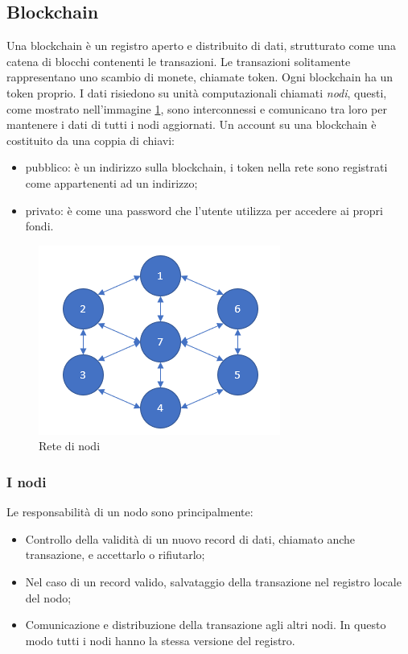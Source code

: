 \documentclass[a4paper]{article}
\begin{document}
    \subsection{Blockchain}
    Una blockchain è un registro aperto e distribuito di dati, strutturato come una catena di blocchi contenenti le transazioni.
    Le transazioni solitamente rappresentano uno scambio di monete, chiamate token. Ogni blockchain ha un token proprio.
    I dati risiedono su unità computazionali chiamati \emph{nodi}, questi, come mostrato nell'immagine \ref{fig:node},
    sono interconnessi e comunicano tra loro per mantenere i dati di tutti i nodi aggiornati\cite{nodo}.
    Un account su una blockchain è costituito da una coppia di chiavi:
    \begin{itemize}
      \item pubblico: è un indirizzo sulla blockchain, i token nella rete sono registrati come appartenenti ad un indirizzo;
      \item privato: è come una password che l'utente utilizza per accedere ai propri fondi.
    \end{itemize}
    \begin{figure}[ht]
      \includegraphics[scale=0.8]{node.png}
      \centering
      \caption{Rete di nodi}
      \centering
      \label{fig:node}
    \end{figure}
    \subsubsection{I nodi}
    Le responsabilità di un nodo sono principalmente:
    \begin{itemize}
      \item Controllo della validità di un nuovo record di dati, chiamato anche transazione, e accettarlo o rifiutarlo;
      \item Nel caso di un record valido, salvataggio della transazione nel registro locale del nodo;
      \item Comunicazione e distribuzione della transazione agli altri nodi. In questo modo tutti i nodi hanno la stessa versione del registro.
    \end{itemize}
\end{document}
